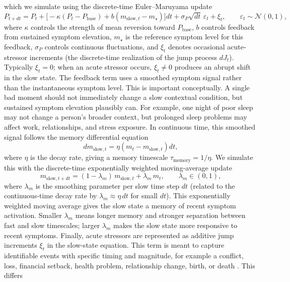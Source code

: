 \documentclass[man,12pt,floatsintext]{apa7}
\begin{document}
which we simulate using the discrete-time Euler--Maruyama update
\begin{equation}
P_{t+dt}=P_t+\Big[-\kappa(P_t-P_{\text{base}})+b(m_{\text{slow},t}-m_\star)\Big]dt
+\sigma_P\sqrt{dt}\,\varepsilon_t+\xi_t,
\qquad \varepsilon_t\sim\mathcal N(0,1),
\label{eq:slow_update}
\end{equation}
where \(\kappa\) controls the strength of mean reversion toward \(P_{\text{base}}\), \(b\) controls feedback from sustained symptom elevation, \(m_\star\) is the reference symptom level for this feedback, \(\sigma_P\) controls continuous fluctuations, and \(\xi_t\) denotes occasional acute-stressor increments (the discrete-time realization of the jump process \(dJ_t\)). Typically \(\xi_t=0\); when an acute stressor occurs, \(\xi_t\neq 0\) produces an abrupt shift in the slow state.
The feedback term uses a smoothed symptom signal rather than the instantaneous symptom level. This is important conceptually. A single bad moment should not immediately change a slow contextual condition, but sustained symptom elevation plausibly can. For example, one night of poor sleep may not change a person's broader context, but prolonged sleep problems may affect work, relationships, and stress exposure. In continuous time, this smoothed signal follows the memory differential equation
\[
dm_{\text{slow},t} = \eta\left(m_t - m_{\text{slow},t}\right)dt,
\]
where \(\eta\) is the decay rate, giving a memory timescale \(\tau_{\text{memory}}=1/\eta\). We simulate this with the discrete-time exponentially weighted moving-average update
\begin{equation}
m_{\text{slow},t+dt} = (1-\lambda_m)\,m_{\text{slow},t} + \lambda_m\,m_t,
\qquad \lambda_m\in(0,1),
\label{eq:mslow}
\end{equation}
where \(\lambda_m\) is the smoothing parameter per slow time step \(dt\) (related to the continuous-time decay rate by \(\lambda_m\approx\eta\,dt\) for small \(dt\)).
This exponentially weighted moving average gives the slow state a memory of recent symptom activation. Smaller \(\lambda_m\) means longer memory and stronger separation between fast and slow timescales; larger \(\lambda_m\) makes the slow state more responsive to recent symptoms.
Finally, acute stressors are represented as additive jump increments \(\xi_t\) in the
slow-state equation. This term is meant to capture identifiable events with specific timing
and magnitude, for example a conflict, loss, financial setback, health problem, relationship
change, birth, or death \parencite{cohen2019ten,dohrenwend2006inventorying}. This differs
\end{document}
